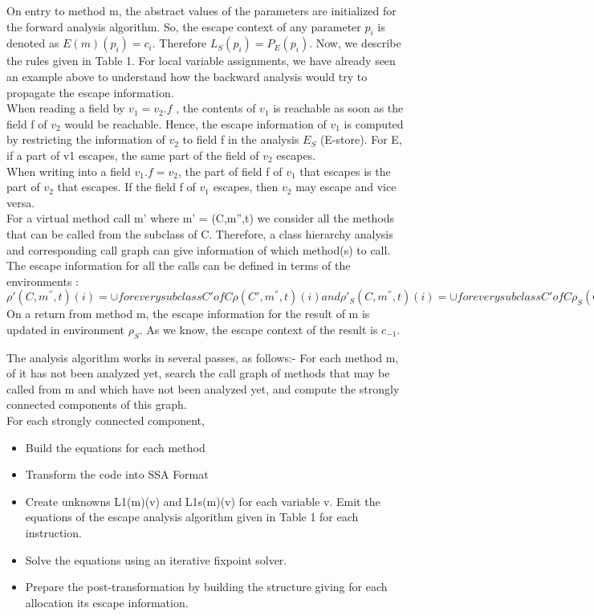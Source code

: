 \documentclass[peerreview]{IEEEtran}
\begin{document}
On entry to method m, the abstract values of the parameters are initialized for the forward analysis algorithm. So, the escape context of any parameter $p_i$ is denoted as $E(m)(p_i) = c_i$. Therefore $L_S(p_i) = P_E(p_i)$. Now, we describe the rules given in Table 1. For local variable assignments, we have already seen an example above to understand how the backward analysis would try to propagate the escape information.\\
When reading a field by $v_1 = v_2.f$ , the contents of $v_1$ is reachable as soon as the field f of $v_2$ would be reachable. Hence, the escape information of $v_1$ is computed by restricting the information of $v_2$ to field f in the analysis $E_S$ (E-store). For E, if a part of v1 escapes, the same part of the field of $v_2$ escapes. \\
When writing into a field $v_1.f = v_2$, the part of field f of $v_1$ that escapes is the part of $v_2$ that escapes. If the field f of $v_1$ escapes, then $v_2$ may escape and vice versa. \\
For a virtual method call m' where m' = (C,m'',t) we consider all the methods that can be called from the subclass of C. Therefore, a class hierarchy analysis and corresponding call graph can give information of which method(s) to call. The escape information for all the calls can be defined in terms of the environments : $\rho'(C,m^{''},t)(i) = \cup for every subclass C' of C \rho(C',m^{''},t)(i) and \rho'_S(C,m^{''},t)(i) = \cup for every subclass C' of C \rho_S(C',m^{''},t)(i)$ \\
On a return from method m, the escape information for the result of m is updated in environment $\rho_S$. As we know, the escape context of the result is $c_{-1}$.

The analysis algorithm works in several passes, as follows:-
For each method m, of it has not been analyzed yet, search the call graph of methods that may be called from m and which have not been analyzed yet, and compute the strongly connected components of this graph. \\[5pt] For each strongly connected component,\\[5pt]
\begin{itemize}
	\item Build the equations for each method
		\item Transform the code into SSA Format
		\item Create unknowns L1(m)(v) and L1s(m)(v) for each variable v. Emit the equations of the escape analysis algorithm given in Table 1 for each instruction.
	\item Solve the equations using an iterative fixpoint solver.
	\item Prepare the post-transformation by building the structure giving for each allocation its escape information. 
\end{itemize}
\end{document}
